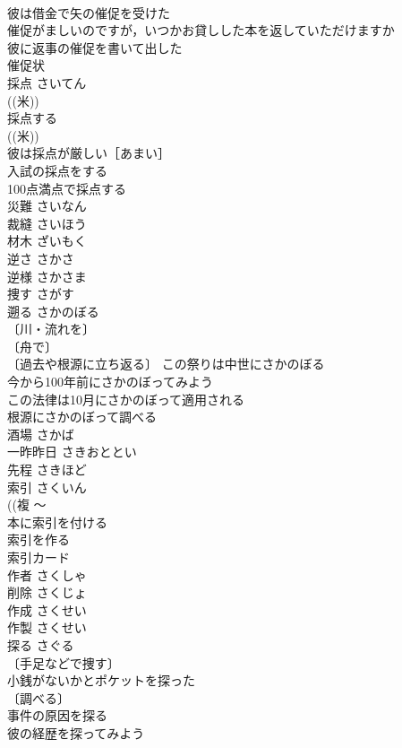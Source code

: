 \documentclass[8pt]{extreport}
\begin{document}
\begin{CJK}{UTF8}{min}
\\	彼は借金で矢の催促を受けた 
\\	催促がましいのですが，いつかお貸しした本を返していただけますか 
\\	彼に返事の催促を書いて出した 
\\	催促状 
\\	採点	さいてん	
\\	((米)) 
\\	採点する 
\\	((米)) 
\\	彼は採点が厳しい［あまい］ 
\\	入試の採点をする 
\\	100点満点で採点する 
\\	災難	さいなん	
\\	裁縫	さいほう	
\\	材木	ざいもく	
\\	逆さ	さかさ	
\\	逆様	さかさま	
\\	捜す	さがす	
\\	遡る	さかのぼる	
\\	〔川・流れを〕
\\	〔舟で〕
\\	〔過去や根源に立ち返る〕 この祭りは中世にさかのぼる 
\\	今から100年前にさかのぼってみよう 
\\	この法律は10月にさかのぼって適用される 
\\	根源にさかのぼって調べる 
\\	酒場	さかば	
\\	一昨昨日	さきおととい	
\\	先程	さきほど	
\\	索引	さくいん	
\\	((複 〜
\\	本に索引を付ける 
\\	索引を作る 
\\	索引カード 
\\	作者	さくしゃ	
\\	削除	さくじょ	
\\	作成	さくせい	
\\	作製	さくせい	
\\	探る	さぐる	
\\	〔手足などで捜す〕
\\	小銭がないかとポケットを探った 
\\	〔調べる〕
\\	事件の原因を探る 
\\	彼の経歴を探ってみよう 

\end{CJK}
\end{document}
